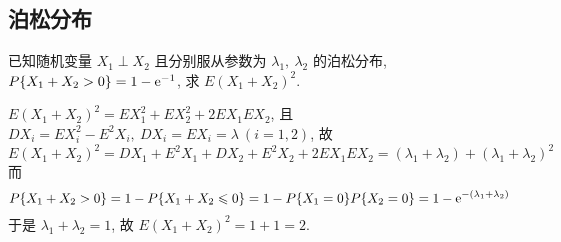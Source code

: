 \subsection{泊松分布}

\begin{example}
    已知随机变量 $X_1 \perp  X_2$ 且分别服从参数为 $\lambda_1,~\lambda_2$ 的泊松分布, $P\qty{X_1+X_2>0}=1-\mathrm{e} ^{-1}$, 求 $E(X_1+X_2)^2$.
\end{example}
\begin{solution}
    $E(X_1+X_2)^2=EX_1^2+EX_2^2+2EX_1EX_2$, 且 $DX_i=EX_i^2-E^2X_i,~DX_i=EX_i=\lambda~(i=1,2)$, 故 
    $$
    E(X_1+X_2)^2=DX_1+E^2X_1+DX_2+E^2X_2+2EX_1EX_2=(\lambda_1+\lambda_2)+(\lambda_1+\lambda_2)^2
    $$
    而 $$
    P\qty{X_1+X_2>0}=1-P\qty{X_1+X_2\leqslant 0}=1-P\qty{X_1=0}P\qty{X_2=0}=1-\mathrm{e} ^{-(\lambda_1+\lambda_2)}
    $$
    于是 $\lambda_1+\lambda_2=1$, 故 $E(X_1+X_2)^2=1+1=2.$
\end{solution}

% 
% 

